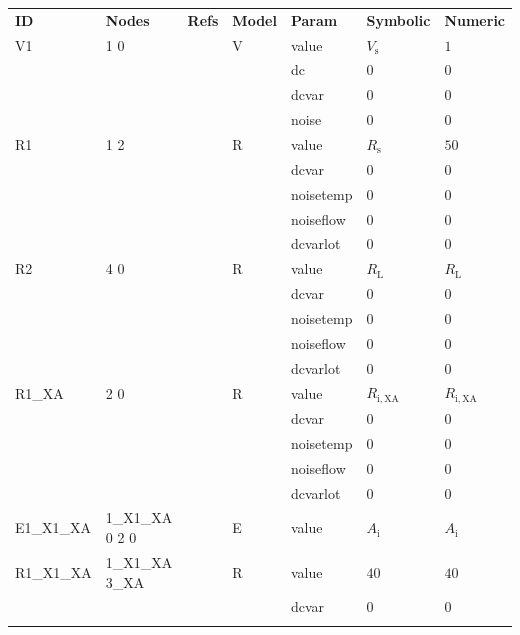 \begin{table}[h]
\centering
\begin{tabular}[c]{lllllll}
\textbf{ID} & \textbf{Nodes} & \textbf{Refs} & \textbf{Model} & \textbf{Param} & \textbf{Symbolic} & \textbf{Numeric} \\ 
\rowcolor{myyellow}
\small{V1} &\small{1 0 } & &\small{V} &\small{value} &$V_{\mathrm{s}}$ &$1$ \\ 
 & & & &\small{dc} &$0$ &$0$ \\ 
\rowcolor{myyellow}
 & & & &\small{dcvar} &$0$ &$0$ \\ 
 & & & &\small{noise} &$0$ &$0$ \\ 
\rowcolor{myyellow}
\small{R1} &\small{1 2 } & &\small{R} &\small{value} &$R_{\mathrm{s}}$ &$50$ \\ 
 & & & &\small{dcvar} &$0$ &$0$ \\ 
\rowcolor{myyellow}
 & & & &\small{noisetemp} &$0$ &$0$ \\ 
 & & & &\small{noiseflow} &$0$ &$0$ \\ 
\rowcolor{myyellow}
 & & & &\small{dcvarlot} &$0$ &$0$ \\ 
\small{R2} &\small{4 0 } & &\small{R} &\small{value} &$R_{\mathrm{L}}$ &$R_{\mathrm{L}}$ \\ 
\rowcolor{myyellow}
 & & & &\small{dcvar} &$0$ &$0$ \\ 
 & & & &\small{noisetemp} &$0$ &$0$ \\ 
\rowcolor{myyellow}
 & & & &\small{noiseflow} &$0$ &$0$ \\ 
 & & & &\small{dcvarlot} &$0$ &$0$ \\ 
\rowcolor{myyellow}
\small{R1\_XA} &\small{2 0 } & &\small{R} &\small{value} &$R_{\mathrm{i},\mathrm{XA}}$ &$R_{\mathrm{i},\mathrm{XA}}$ \\ 
 & & & &\small{dcvar} &$0$ &$0$ \\ 
\rowcolor{myyellow}
 & & & &\small{noisetemp} &$0$ &$0$ \\ 
 & & & &\small{noiseflow} &$0$ &$0$ \\ 
\rowcolor{myyellow}
 & & & &\small{dcvarlot} &$0$ &$0$ \\ 
\small{E1\_X1\_XA} &\small{1\_X1\_XA 0 2 0 } & &\small{E} &\small{value} &$A_{\mathrm{i}}$ &$A_{\mathrm{i}}$ \\ 
\rowcolor{myyellow}
\small{R1\_X1\_XA} &\small{1\_X1\_XA 3\_XA } & &\small{R} &\small{value} &$40$ &$40$ \\ 
 & & & &\small{dcvar} &$0$ &$0$ \\ 
\rowcolor{myyellow}

\end{tabular}
\end{table}
